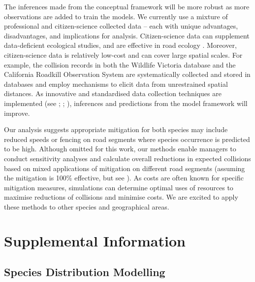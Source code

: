 The inferences made from the conceptual framework will be more robust as more observations are added to train the models.  We currently use a mixture of professional and citizen-science collected data -- each with unique advantages, disadvantages, and implications for analysis.  Citizen-science data can supplement data-deficient ecological studies, and are effective in road ecology \citep{paul14}.  Moreover, citizen-science data is relatively low-cost and can cover large spatial scales.  For example, the collision records in both the Wildlife Victoria database and the California Roadkill Observation System are systematically collected and stored in databases and employ mechanisms to elicit data from unrestrained spatial distances.  As innovative and standardised data collection techniques are implemented (see \cite{aane09}; \cite{dona10}; \cite{shil15b}), inferences and predictions from the model framework will improve.

Our analysis suggests appropriate mitigation for both species may include reduced speeds or fencing on road segments where species occurrence is predicted to be high.  Although omitted for this work, our methods enable managers to conduct sensitivity analyses and calculate overall reductions in expected collisions based on mixed applications of mitigation on different road segments (assuming the mitigation is 100\% effective, but see \cite{huij09}).  As costs are often known for specific mitigation measures, simulations can determine optimal uses of resources to maximise reductions of collisions and minimise costs. We are excited to apply these methods to other species and geographical areas.

\section{Supplemental Information}\label{isec:occ}

\subsection{Species Distribution Modelling}

